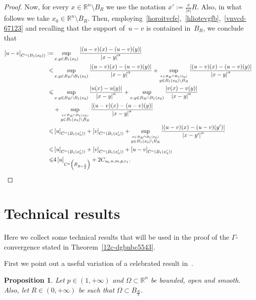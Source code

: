 \documentclass[12pt]{article}
\newcommand{\R}{\mathbb{R}}
\numberwithin{equation}{section}
\newtheorem{prop}[thm]{Proposition}
\renewcommand{\leq}{\leqslant}
\begin{document}
\begin{appendix}
\begin{proof}
Now, for every $x\in \R^n\setminus B_R$ we use the notation $x':=\frac{x}{\left|x\right|}R$. Also, in what follows we take $x_0\in\R^n\setminus \overline{B}_R$. Then, employing~\eqref{horoitvcfe},~\eqref{hliotevgfb},~\eqref{vnvcd-67123} and recalling that the support of~$u-v$ is contained in~$B_R$, we conclude that
\begin{equation*}
\begin{split}
\left[u-v\right]_{C^\alpha\left(B_1(x_0)\right)} :=&\sup_{x,y\in B_1(x_0)}\frac{\left|(u-v)(x)-(u-v)(y)\right|}{\left|x-y\right|^\alpha}\\
\leq & \sup_{x,y\in B_R\cap B_1(x_0)}\frac{\left|(u-v)(x)-(u-v)(y)\right|}{\left|x-y\right|^\alpha}+\sup_{\overset{x\in B_R\cap B_1(x_0)}{y\in B_1(x_0)\setminus B_R}}\frac{\left|(u-v)(x)-(u-v)(y)\right|}{\left|x-y\right|^\alpha}\\
\leq &\sup_{x,y\in B_R\cap B_1(x_0)}\frac{\left|u(x)-u(y)\right|}{\left|x-y\right|^\alpha}+\sup_{x,y\in B_R\cap B_1(x_0)}\frac{\left|v(x)-v(y)\right|}{\left|x-y\right|^\alpha}\\
&+ \sup_{\overset{x\in B_R\cap B_1(x_0)}{y\in B_1(x_0)\setminus B_R}}\frac{\left|(u-v)(x)-(u-v)(y)\right|}{\left|x-y\right|^\alpha}\\
\leq & \left[u\right]_{C^\alpha(B_1(x_0'))}+ \left[v\right]_{C^\alpha(B_1(x_0'))}+\sup_{\overset{x\in B_R\cap B_1(x_0)}{y\in B_1(x_0)\setminus B_R}}\frac{\left|(u-v)(x)-(u-v)(y')\right|}{\left|x-y'\right|^\alpha}\\
\leq &\left[u\right]_{C^\alpha(B_1(x_0'))}+\left[v\right]_{C^\alpha(B_1(x_0'))}+\left[u-v\right]_{C^\alpha(B_1(x_0'))}\\
\leq & 4\left[u\right]_{C^\alpha\left(B_{R+\frac{3}{2}}\right)}+ 2C_{s_0,n,m,p,c_1}.\qedhere
\end{split}
\end{equation*}




\end{proof}







\section{Technical results}
Here we collect some technical results that will be used in the proof of the $\Gamma$-convergence stated in Theorem~\ref{12c-dgbnbc5543}. 

First we point out a useful variation of a celebrated result in~\cite{MR3586796}. 
\begin{prop}\label{prop-cont}
Let $p\in (1,+\infty)$ and $\Omega\subset \R^n$ be bounded, open and smooth. Also, let $R\in (0,+\infty)$ be such that $\Omega\subset B_{\frac{R}{3}}$. 


\end{prop}
\end{appendix}
\end{document}
